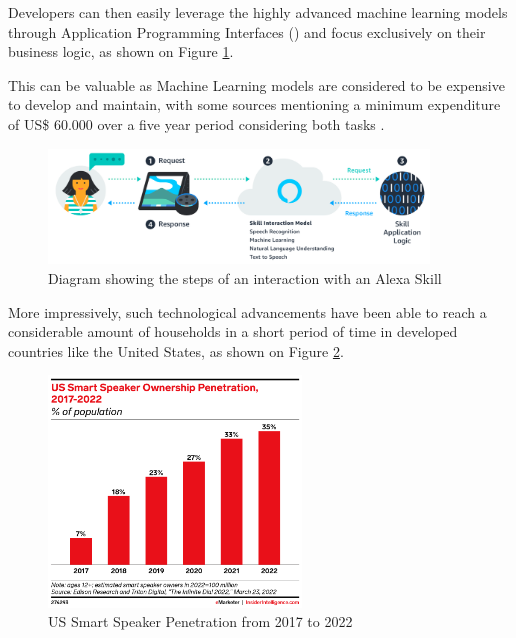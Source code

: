 \documentclass[openright]{normas-utf-tex} %
\begin{document}
Developers can then easily leverage the highly advanced machine learning models
through Application Programming Interfaces () and focus exclusively on their business logic, as shown on Figure
\ref{fig:alexaskill}.

This can be valuable as Machine Learning models are considered to be
expensive to develop and maintain, with some sources mentioning a minimum expenditure 
of US\$ 60.000 over a five year period considering both tasks \cite{Phdata2021}.

\begin{figure}[htb!]
	\centering
	\includegraphics[width=0.9\textwidth]{./images/skills.png} %
	\caption[Diagram showing the steps of an interaction with an Alexa Skill]{Diagram showing the steps of an interaction with an Alexa Skill}
	\label{fig:alexaskill}
\end{figure}

More impressively, such technological advancements have been able to reach a
considerable amount of households in a short period of time in developed
countries like the United States, as shown on Figure \ref{fig:smartspeaker}.

\begin{figure}[H]
	\centering
	\includegraphics[width=0.6\textwidth]{./images/smartspeaker.png} %
	\caption[US Smart Speaker Penetration from 2017 to 2022]{US Smart Speaker Penetration from 2017 to 2022}
	\label{fig:smartspeaker}
\end{figure}
\end{document}
